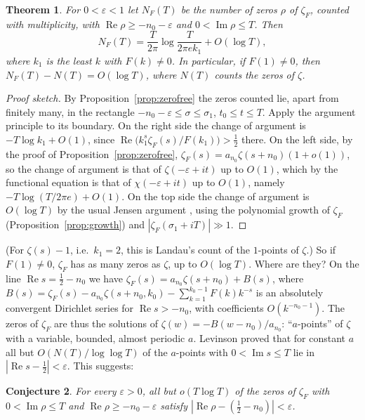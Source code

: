 \documentclass[11pt,reqno]{amsart}
\newtheorem{theorem}{Theorem}[section]
\newtheorem{conjecture}[theorem]{Conjecture}
\theoremstyle{definition}
\theoremstyle{remark}
\begin{document}
\begin{theorem}\label{thm:count}
For $0 < \varepsilon < 1$ let $N_F(T)$ be the number of zeros $\rho$ of $\zeta_F$, counted with multiplicity, with
$\operatorname{Re}\rho \ge -n_0-\varepsilon$ and $0 < \operatorname{Im}\rho \le T$. Then
\[
  N_F(T) = \frac{T}{2\pi}\log\frac{T}{2\pi e k_1} + O(\log T),
\]
where $k_1$ is the least $k$ with $F(k) \ne 0$. In particular, if $F(1) \ne 0$, then $N_F(T) - N(T) = O(\log T)$,
where $N(T)$ counts the zeros of $\zeta$.
\end{theorem}

\begin{proof}[Proof sketch]
By Proposition~\ref{prop:zerofree} the zeros counted lie, apart from finitely many, in the rectangle
$-n_0-\varepsilon \le \sigma \le \sigma_1$, $t_0 \le t \le T$. Apply the argument principle to its boundary. On the
right side the change of argument is $-T\log k_1 + O(1)$, since $\operatorname{Re}\bigl(k_1^s\zeta_F(s)/F(k_1)\bigr) > \frac12$
there. On the
left side, by the proof of Proposition~\ref{prop:zerofree}, $\zeta_F(s) = a_{n_0}\zeta(s+n_0)(1 + o(1))$, so the change
of argument is that of $\zeta(-\varepsilon+it)$ up to $O(1)$, which by the functional equation is that of
$\chi(-\varepsilon+it)$ up to $O(1)$, namely $-T\log(T/2\pi e) + O(1)$. On the top side the change of argument is
$O(\log T)$ by the usual Jensen argument \cite[\S9.4]{Tit86}, using the polynomial growth of $\zeta_F$
(Proposition~\ref{prop:growth}) and $|\zeta_F(\sigma_1+iT)| \gg 1$.
\end{proof}

(For $\zeta(s) - 1$, i.e.\ $k_1 = 2$, this is Landau's count of the $1$-points of $\zeta$.) So if $F(1) \ne 0$,
$\zeta_F$ has as many zeros as $\zeta$, up to $O(\log T)$. Where are they? On the line
$\operatorname{Re}s = \frac12 - n_0$ we have $\zeta_F(s) = a_{n_0}\zeta(s+n_0) + B(s)$, where
$B(s) = \zeta_F(s) - a_{n_0}\zeta(s+n_0,k_0) - \sum_{k=1}^{k_0-1}F(k)k^{-s}$ is an absolutely convergent Dirichlet series
for $\operatorname{Re}s > -n_0$, with coefficients $O(k^{-n_0-1})$. The zeros of $\zeta_F$ are thus the solutions of
$\zeta(w) = -B(w-n_0)/a_{n_0}$: ``$a$-points'' of $\zeta$ with a variable, bounded, almost periodic $a$. Levinson
\cite{Lev75} proved that for constant $a$ all but $O(N(T)/\log\log T)$ of the $a$-points with
$0 < \operatorname{Im}s \le T$ lie in $|\operatorname{Re}s - \frac12| < \varepsilon$. This suggests:

\begin{conjecture}\label{conj:cluster}
For every $\varepsilon > 0$, all but $o(T\log T)$ of the zeros of $\zeta_F$ with $0 < \operatorname{Im}\rho \le T$ and
$\operatorname{Re}\rho \ge -n_0 - \varepsilon$ satisfy $|\operatorname{Re}\rho - (\frac12 - n_0)| < \varepsilon$.
\end{conjecture}
\end{document}
